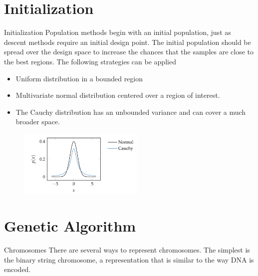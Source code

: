 \documentclass{beamer}
\begin{document}
\section{Initialization}
\begin{frame}{Initialization}
Population methods begin with an initial population, just as descent methods require an initial design point. The initial population should be spread over the design space to increase the chances that the samples are close to the best regions. 
The following strategies can be applied
\begin{itemize}
    \item Uniform distribution in a bounded region
    \item Multivariate normal distribution centered over a region of interest.
    \item The Cauchy distribution has an unbounded variance and can cover a much broader space.
\end{itemize}

\begin{figure}
\centering
\includegraphics[width=60mm]{Figs/cauchy.jpeg}
\end{figure}   
\end{frame}


\section{Genetic Algorithm}
\begin{frame}{Chromosomes}
There are several ways to represent chromosomes. The simplest is the binary string chromosome, a representation that is similar to the way DNA is encoded.
\end{frame}
\end{document}
